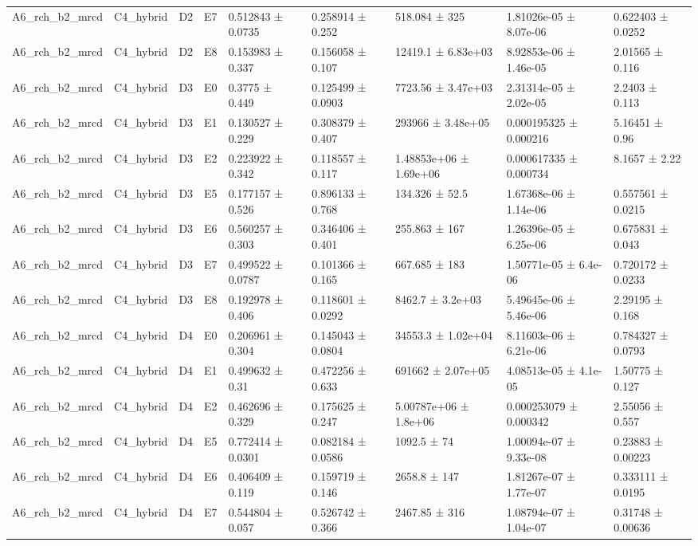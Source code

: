 \begin{table}
\begin{tabular}{lllllllll}
A6\_rch\_b2\_mrcd & C4\_hybrid & D2 & E7 & 0.512843 ± 0.0735 & 0.258914 ± 0.252 & 518.084 ± 325 & 1.81026e-05 ± 8.07e-06 & 0.622403 ± 0.0252 \\
A6\_rch\_b2\_mrcd & C4\_hybrid & D2 & E8 & 0.153983 ± 0.337 & 0.156058 ± 0.107 & 12419.1 ± 6.83e+03 & 8.92853e-06 ± 1.46e-05 & 2.01565 ± 0.116 \\
A6\_rch\_b2\_mrcd & C4\_hybrid & D3 & E0 & 0.3775 ± 0.449 & 0.125499 ± 0.0903 & 7723.56 ± 3.47e+03 & 2.31314e-05 ± 2.02e-05 & 2.2403 ± 0.113 \\
A6\_rch\_b2\_mrcd & C4\_hybrid & D3 & E1 & 0.130527 ± 0.229 & 0.308379 ± 0.407 & 293966 ± 3.48e+05 & 0.000195325 ± 0.000216 & 5.16451 ± 0.96 \\
A6\_rch\_b2\_mrcd & C4\_hybrid & D3 & E2 & 0.223922 ± 0.342 & 0.118557 ± 0.117 & 1.48853e+06 ± 1.69e+06 & 0.000617335 ± 0.000734 & 8.1657 ± 2.22 \\
A6\_rch\_b2\_mrcd & C4\_hybrid & D3 & E5 & 0.177157 ± 0.526 & 0.896133 ± 0.768 & 134.326 ± 52.5 & 1.67368e-06 ± 1.14e-06 & 0.557561 ± 0.0215 \\
A6\_rch\_b2\_mrcd & C4\_hybrid & D3 & E6 & 0.560257 ± 0.303 & 0.346406 ± 0.401 & 255.863 ± 167 & 1.26396e-05 ± 6.25e-06 & 0.675831 ± 0.043 \\
A6\_rch\_b2\_mrcd & C4\_hybrid & D3 & E7 & 0.499522 ± 0.0787 & 0.101366 ± 0.165 & 667.685 ± 183 & 1.50771e-05 ± 6.4e-06 & 0.720172 ± 0.0233 \\
A6\_rch\_b2\_mrcd & C4\_hybrid & D3 & E8 & 0.192978 ± 0.406 & 0.118601 ± 0.0292 & 8462.7 ± 3.2e+03 & 5.49645e-06 ± 5.46e-06 & 2.29195 ± 0.168 \\
A6\_rch\_b2\_mrcd & C4\_hybrid & D4 & E0 & 0.206961 ± 0.304 & 0.145043 ± 0.0804 & 34553.3 ± 1.02e+04 & 8.11603e-06 ± 6.21e-06 & 0.784327 ± 0.0793 \\
A6\_rch\_b2\_mrcd & C4\_hybrid & D4 & E1 & 0.499632 ± 0.31 & 0.472256 ± 0.633 & 691662 ± 2.07e+05 & 4.08513e-05 ± 4.1e-05 & 1.50775 ± 0.127 \\
A6\_rch\_b2\_mrcd & C4\_hybrid & D4 & E2 & 0.462696 ± 0.329 & 0.175625 ± 0.247 & 5.00787e+06 ± 1.8e+06 & 0.000253079 ± 0.000342 & 2.55056 ± 0.557 \\
A6\_rch\_b2\_mrcd & C4\_hybrid & D4 & E5 & 0.772414 ± 0.0301 & 0.082184 ± 0.0586 & 1092.5 ± 74 & 1.00094e-07 ± 9.33e-08 & 0.23883 ± 0.00223 \\
A6\_rch\_b2\_mrcd & C4\_hybrid & D4 & E6 & 0.406409 ± 0.119 & 0.159719 ± 0.146 & 2658.8 ± 147 & 1.81267e-07 ± 1.77e-07 & 0.333111 ± 0.0195 \\
A6\_rch\_b2\_mrcd & C4\_hybrid & D4 & E7 & 0.544804 ± 0.057 & 0.526742 ± 0.366 & 2467.85 ± 316 & 1.08794e-07 ± 1.04e-07 & 0.31748 ± 0.00636 \\

\end{tabular}
\end{table}
